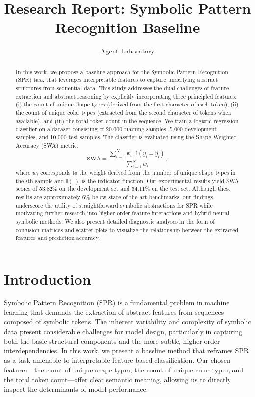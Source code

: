 \documentclass{article}
\title{Research Report: Symbolic Pattern Recognition Baseline}
\author{Agent Laboratory}
\date{}
\begin{document}
\maketitle

\begin{abstract}
In this work, we propose a baseline approach for the Symbolic Pattern Recognition (SPR) task that leverages interpretable features to capture underlying abstract structures from sequential data. This study addresses the dual challenges of feature extraction and abstract reasoning by explicitly incorporating three principled features: (i) the count of unique shape types (derived from the first character of each token), (ii) the count of unique color types (extracted from the second character of tokens when available), and (iii) the total token count in the sequence. We train a logistic regression classifier on a dataset consisting of 20,000 training samples, 5,000 development samples, and 10,000 test samples. The classifier is evaluated using the Shape-Weighted Accuracy (SWA) metric:
\[
\mathrm{SWA} = \frac{\sum_{i=1}^N w_i \cdot \mathbb{I}(y_i = \hat{y}_i)}{\sum_{i=1}^N w_i},
\]
where \(w_i\) corresponds to the weight derived from the number of unique shape types in the \(i\)th sample and \(\mathbb{I}(\cdot)\) is the indicator function. Our experimental results yield SWA scores of 53.82\% on the development set and 54.11\% on the test set. Although these results are approximately 6\% below state-of-the-art benchmarks, our findings underscore the utility of straightforward symbolic abstractions for SPR while motivating further research into higher-order feature interactions and hybrid neural-symbolic methods. We also present detailed diagnostic analyses in the form of confusion matrices and scatter plots to visualize the relationship between the extracted features and prediction accuracy.
\end{abstract}

\section{Introduction}
Symbolic Pattern Recognition (SPR) is a fundamental problem in machine learning that demands the extraction of abstract features from sequences composed of symbolic tokens. The inherent variability and complexity of symbolic data present considerable challenges for model design, particularly in capturing both the basic structural components and the more subtle, higher-order interdependencies. In this work, we present a baseline method that reframes SPR as a task amenable to interpretable feature-based classification. Our chosen features—the count of unique shape types, the count of unique color types, and the total token count—offer clear semantic meaning, allowing us to directly inspect the determinants of model performance.
\end{document}
